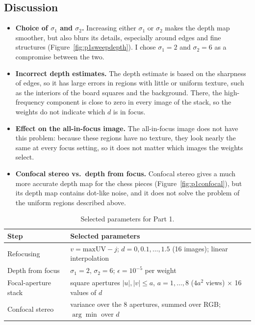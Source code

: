 \documentclass[11pt]{article}
\begin{document}
\subsection*{Discussion}
\begin{itemize}\setlength{\itemsep}{2pt}
\item \textbf{Choice of $\sigma_1$ and $\sigma_2$.} Increasing either $\sigma_1$ or $\sigma_2$ makes the depth map smoother, but also blurs its details, especially around edges and fine structures (Figure~\ref{fig:p1sweepdepth}). I chose $\sigma_1=2$ and $\sigma_2=6$ as a compromise between the two.
\item \textbf{Incorrect depth estimates.} The depth estimate is based on the sharpness of edges, so it has large errors in regions with little or uniform texture, such as the interiors of the board squares and the background. There, the high-frequency component is close to zero in every image of the stack, so the weights do not indicate which $d$ is in focus.
\item \textbf{Effect on the all-in-focus image.} The all-in-focus image does not have this problem: because these regions have no texture, they look nearly the same at every focus setting, so it does not matter which images the weights select.
\item \textbf{Confocal stereo vs.\ depth from focus.} Confocal stereo gives a much more accurate depth map for the chess pieces (Figure~\ref{fig:p1confocal}), but its depth map contains dot-like noise, and it does not solve the problem of the uniform regions described above.
\end{itemize}

\begin{table}[!htbp]
\centering
\small
\begin{tabular}{ll}
\toprule
Step & Selected parameters \\
\midrule
Refocusing & $v=\mathrm{maxUV}-j$; $d=0,0.1,\dots,1.5$ (16 images); linear interpolation \\
Depth from focus & $\sigma_1=2$, $\sigma_2=6$; $\epsilon=10^{-5}$ per weight \\
Focal-aperture stack & square apertures $|u|,|v|\le a$, $a=1,\dots,8$ ($4a^2$ views) $\times$ 16 values of $d$ \\
Confocal stereo & variance over the 8 apertures, summed over RGB; $\arg\min$ over $d$ \\
\bottomrule
\end{tabular}
\caption{Selected parameters for Part 1.}
\label{tab:p1params}
\end{table}
\end{document}
